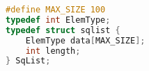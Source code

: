 \begin{lstlisting}[title=顺序存储的结构代码,language=C,frame=tb,backgroundcolor=\color{red!10}]
#define MAX_SIZE 100
typedef int ElemType;
typedef struct sqlist {
    ElemType data[MAX_SIZE];
    int length;
} SqList;
\end{lstlisting}
